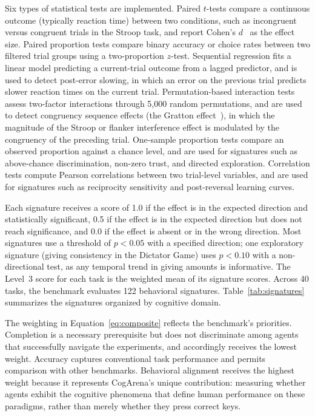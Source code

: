 \documentclass{article}
\begin{document}
Six types of statistical tests are implemented. Paired $t$-tests compare a continuous outcome (typically reaction time) between two conditions, such as incongruent versus congruent trials in the Stroop task, and report Cohen's $d$~\citep{cohen1988statistical} as the effect size. Paired proportion tests compare binary accuracy or choice rates between two filtered trial groups using a two-proportion $z$-test. Sequential regression fits a linear model predicting a current-trial outcome from a lagged predictor, and is used to detect post-error slowing, in which an error on the previous trial predicts slower reaction times on the current trial. Permutation-based interaction tests assess two-factor interactions through 5,000 random permutations, and are used to detect congruency sequence effects (the Gratton effect~\citep{gratton1992cse}), in which the magnitude of the Stroop or flanker interference effect is modulated by the congruency of the preceding trial. One-sample proportion tests compare an observed proportion against a chance level, and are used for signatures such as above-chance discrimination, non-zero trust, and directed exploration. Correlation tests compute Pearson correlations between two trial-level variables, and are used for signatures such as reciprocity sensitivity and post-reversal learning curves.

Each signature receives a score of 1.0 if the effect is in the expected direction and statistically significant, 0.5 if the effect is in the expected direction but does not reach significance, and 0.0 if the effect is absent or in the wrong direction. Most signatures use a threshold of $p < 0.05$ with a specified direction; one exploratory signature (giving consistency in the Dictator Game) uses $p < 0.10$ with a non-directional test, as any temporal trend in giving amounts is informative. The Level~3 score for each task is the weighted mean of its signature scores. Across 40 tasks, the benchmark evaluates 122 behavioral signatures. Table~\ref{tab:signatures} summarizes the signatures organized by cognitive domain.

The weighting in Equation~\ref{eq:composite} reflects the benchmark's priorities. Completion is a necessary prerequisite but does not discriminate among agents that successfully navigate the experiments, and accordingly receives the lowest weight. Accuracy captures conventional task performance and permits comparison with other benchmarks. Behavioral alignment receives the highest weight because it represents CogArena's unique contribution: measuring whether agents exhibit the cognitive phenomena that define human performance on these paradigms, rather than merely whether they press correct keys.
\end{document}
